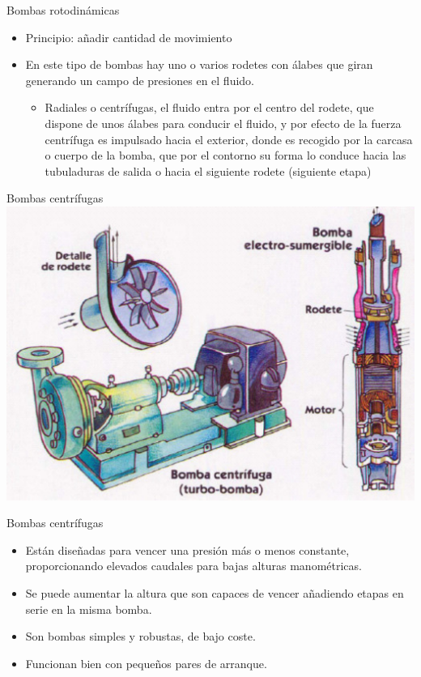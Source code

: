 \documentclass[xcolor={usenames,svgnames,dvipsnames}]{beamer}
\begin{document}
\begin{frame}[label=sec-2-2-6]{Bombas rotodinámicas}
\begin{itemize}
\item \alert{Principio}: añadir cantidad de movimiento

\item En este tipo de bombas hay uno o varios rodetes con álabes que giran generando un campo de presiones en el fluido.

\begin{itemize}
\item \alert{Radiales o centrífugas}, el fluido entra por el centro del rodete, que dispone de unos álabes para conducir el fluido, y por efecto de la fuerza centrífuga es impulsado hacia el exterior, donde es recogido por la carcasa o cuerpo de la bomba, que por el contorno su forma lo conduce hacia las tubuladuras de salida o hacia el siguiente rodete (siguiente etapa)
\end{itemize}
\end{itemize}
\end{frame}

\begin{frame}[label=sec-2-2-7]{Bombas centrífugas}
\includegraphics[width=.9\linewidth]{../figs/BombaCentrifuga.pdf}
\end{frame}

\begin{frame}[label=sec-2-2-8]{Bombas centrífugas}
\begin{itemize}
\item Están diseñadas para vencer una \alert{presión más o menos constante}, proporcionando \alert{elevados caudales para bajas alturas manométricas}.

\item Se puede aumentar la altura que son capaces de vencer añadiendo etapas en serie en la misma bomba.

\item Son \alert{bombas simples y robustas, de bajo coste}.

\item Funcionan bien con pequeños pares de arranque.
\end{itemize}
\end{frame}
\end{document}
